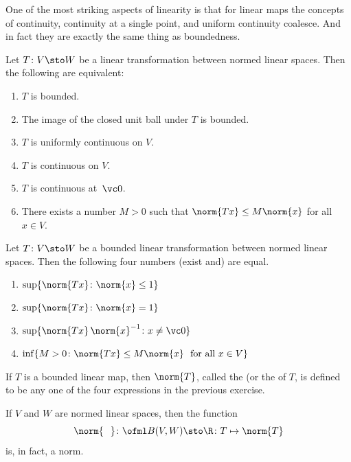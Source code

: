 One of the most striking aspects of linearity is that for linear maps the concepts of
continuity, continuity at a single point, and uniform continuity coalesce.  And in fact
they are exactly the same thing as boundedness.

\begin{thm}\label{C023221} Let $T \colon V \sto W$ be a linear transformation between normed
linear spaces. Then the following are equivalent:
  \begin{enumerate}[label=\rm{(\alph*)}]
    \item $T$ is bounded.
    \item The image of the closed unit ball under $T$ is bounded.
    \item $T$ is uniformly continuous on $V$.
    \item $T$ is continuous on $V$.
    \item $T$ is continuous at~$\vc 0$.
    \item There exists a number $M > 0$ such that $\norm{Tx} \le M\norm{x}$ for all $x \in V$.
  \end{enumerate}
\end{thm}

\begin{prop} Let $T\colon V \sto W$ be a bounded linear transformation between normed linear
spaces.  Then the following four numbers (exist and) are equal.
 \begin{enumerate}[label=\rm{(\alph*)}]
  \item $\sup\{\norm{Tx}\colon \norm{x} \le 1\}$
  \item $\sup\{\norm{Tx}\colon \norm{x} = 1\}$
  \item $\sup\{\norm{Tx}\,\norm{x}^{-1}\colon x \ne \vc 0\}$
  \item $\inf\{M > 0\colon \norm{Tx} \le M\norm{x}\ \text{ for all $x \in V$}\}$
 \end{enumerate}
\end{prop}

\begin{defn}\label{defn_op_norm} If $T$ is a bounded linear map, then $\norm{T}$, called the
 (or the
  of $T$, is defined to be any one of the four expressions in the previous exercise.
\end{defn}

\begin{exam}\label{exam_op_norm_norm} If $V$ and $W$ are normed linear spaces, then the function
   \[ \norm{\hphantom{T}}\colon \ofml B(V,W) \sto \R   \colon T \mapsto \norm{T} \]
is, in fact, a norm.
\end{exam}

